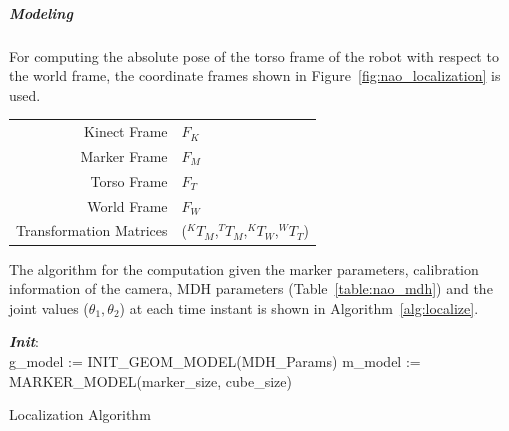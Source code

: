\subparagraph{Modeling}
For computing the absolute pose of the torso frame of the robot with respect to the world frame, the coordinate frames shown in Figure~\ref{fig:nao_localization} is used. 
\begin{tabular}{r l}
\centering
  Kinect Frame & $F_K$ \\ 
  Marker Frame & $F_M$ \\ 
  Torso Frame & $F_T$ \\ 
  World Frame & $F_W$ \\ 
  Transformation Matrices  & ($^{K}T_M$,$^{T}T_M$,$^{K}T_W$,$^{W}T_T$) \\
\end{tabular}
The algorithm for the computation given the marker parameters, calibration information of the camera, MDH parameters (Table~\ref{table:nao_mdh}) and the joint values ($\theta_1,\theta_2$) at each time instant is shown in Algorithm~\ref{alg:localize}.
\begin{algorithm}
 \textbf{\emph{Init}}:\\
 g\_model := INIT\_GEOM\_MODEL(MDH\_Params)\;
 m\_model := MARKER\_MODEL(marker\_size, cube\_size)\;
 \caption{Localization Algorithm}
 \label{alg:localize}
\end{algorithm}

